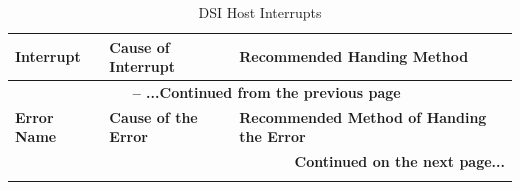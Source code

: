 \documentclass[main\_\_EN.tex]{subfiles}
\begin{document}
\begin{longtable}[c]{ |p{5cm}|p{5cm}|p{5cm}| }
    \caption{DSI Host Interrupts}
    \label{tab:dsi-host-interrupt}\\\hline

    \rowcolor{lightgray}
    \textbf{Interrupt} & \textbf{Cause of Interrupt} & \textbf{Recommended Handing Method}  \\\hline
    \endfirsthead


    \multicolumn{3}{c}{\bfseries \tablename\ \thetable{} -- ...Continued from the previous page}\\\hline
    \rowcolor{lightgray}
    \textbf{Error Name} & \textbf{Cause of the Error} & \textbf{Recommended Method of Handing the Error}  \\\hline
    \endhead

    \multicolumn{3}{r}{\textbf{Continued on the next page...}} \\
    \endfoot

    \endlastfoot


\end{longtable}
\end{document}
